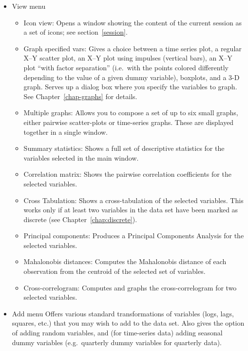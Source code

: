 \begin{itemize}
\item \textsf{View menu} 
  \begin{itemize}
  \item \textsf{Icon view}: Opens a window showing the content of
    the current session as a set of icons; see section~\ref{session}.
  \item \textsf{Graph specified vars}: Gives a choice between a time
    series plot, a regular X--Y scatter plot, an X--Y plot using
    impulses (vertical bars), an X--Y plot ``with factor separation''
    (i.e.\ with the points colored differently depending to the value
    of a given dummy variable), boxplots, and a 3-D graph. Serves up a
    dialog box where you specify the variables to graph. See
    Chapter~\ref{chap-graphs} for details.
  \item \textsf{Multiple graphs}: Allows you to compose a set of up to
    six small graphs, either pairwise scatter-plots or time-series
    graphs.  These are displayed together in a single window.
  \item \textsf{Summary statistics}: Shows a full set of
    descriptive statistics for the variables selected in the main
    window.
  \item \textsf{Correlation matrix}: Shows the pairwise correlation
    coefficients for the selected variables.
  \item \textsf{Cross Tabulation}: Shows a cross-tabulation of the
    selected variables.  This works only if at least two variables
    in the data set have been marked as discrete (see
    Chapter~\ref{chap:discrete}).  
  \item \textsf{Principal components}: Produces a Principal Components
    Analysis for the selected variables.
  \item \textsf{Mahalonobis distances}: Computes the Mahalonobis
    distance of each observation from the centroid of the selected set
    of variables.
  \item \textsf{Cross-correlogram}: Computes and graphs the
    cross-correlogram for two selected variables.
  \end{itemize}

\item \textsf{Add menu} Offers various standard transformations
  of variables (logs, lags, squares, etc.) that you may wish to add to
  the data set. Also gives the option of adding random variables, and
  (for time-series data) adding seasonal dummy variables (e.g.\
  quarterly dummy variables for quarterly data).


\end{itemize}
